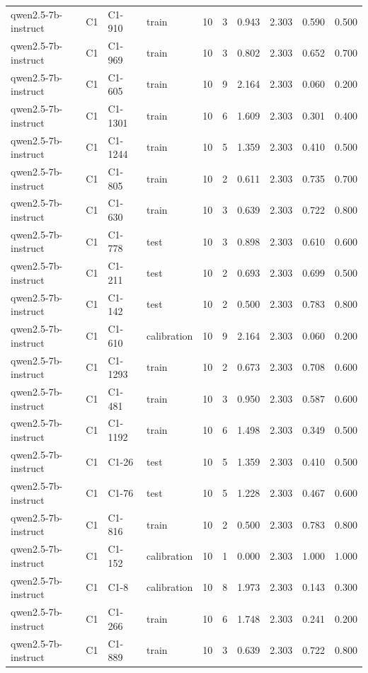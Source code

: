 \begin{table}
\begin{tabular}{llllrrrrrr}
qwen2.5-7b-instruct & C1 & C1-910 & train & 10 & 3 & 0.943 & 2.303 & 0.590 & 0.500 \\
qwen2.5-7b-instruct & C1 & C1-969 & train & 10 & 3 & 0.802 & 2.303 & 0.652 & 0.700 \\
qwen2.5-7b-instruct & C1 & C1-605 & train & 10 & 9 & 2.164 & 2.303 & 0.060 & 0.200 \\
qwen2.5-7b-instruct & C1 & C1-1301 & train & 10 & 6 & 1.609 & 2.303 & 0.301 & 0.400 \\
qwen2.5-7b-instruct & C1 & C1-1244 & train & 10 & 5 & 1.359 & 2.303 & 0.410 & 0.500 \\
qwen2.5-7b-instruct & C1 & C1-805 & train & 10 & 2 & 0.611 & 2.303 & 0.735 & 0.700 \\
qwen2.5-7b-instruct & C1 & C1-630 & train & 10 & 3 & 0.639 & 2.303 & 0.722 & 0.800 \\
qwen2.5-7b-instruct & C1 & C1-778 & test & 10 & 3 & 0.898 & 2.303 & 0.610 & 0.600 \\
qwen2.5-7b-instruct & C1 & C1-211 & test & 10 & 2 & 0.693 & 2.303 & 0.699 & 0.500 \\
qwen2.5-7b-instruct & C1 & C1-142 & test & 10 & 2 & 0.500 & 2.303 & 0.783 & 0.800 \\
qwen2.5-7b-instruct & C1 & C1-610 & calibration & 10 & 9 & 2.164 & 2.303 & 0.060 & 0.200 \\
qwen2.5-7b-instruct & C1 & C1-1293 & train & 10 & 2 & 0.673 & 2.303 & 0.708 & 0.600 \\
qwen2.5-7b-instruct & C1 & C1-481 & train & 10 & 3 & 0.950 & 2.303 & 0.587 & 0.600 \\
qwen2.5-7b-instruct & C1 & C1-1192 & train & 10 & 6 & 1.498 & 2.303 & 0.349 & 0.500 \\
qwen2.5-7b-instruct & C1 & C1-26 & test & 10 & 5 & 1.359 & 2.303 & 0.410 & 0.500 \\
qwen2.5-7b-instruct & C1 & C1-76 & test & 10 & 5 & 1.228 & 2.303 & 0.467 & 0.600 \\
qwen2.5-7b-instruct & C1 & C1-816 & train & 10 & 2 & 0.500 & 2.303 & 0.783 & 0.800 \\
qwen2.5-7b-instruct & C1 & C1-152 & calibration & 10 & 1 & 0.000 & 2.303 & 1.000 & 1.000 \\
qwen2.5-7b-instruct & C1 & C1-8 & calibration & 10 & 8 & 1.973 & 2.303 & 0.143 & 0.300 \\
qwen2.5-7b-instruct & C1 & C1-266 & train & 10 & 6 & 1.748 & 2.303 & 0.241 & 0.200 \\
qwen2.5-7b-instruct & C1 & C1-889 & train & 10 & 3 & 0.639 & 2.303 & 0.722 & 0.800 \\

\end{tabular}
\end{table}
